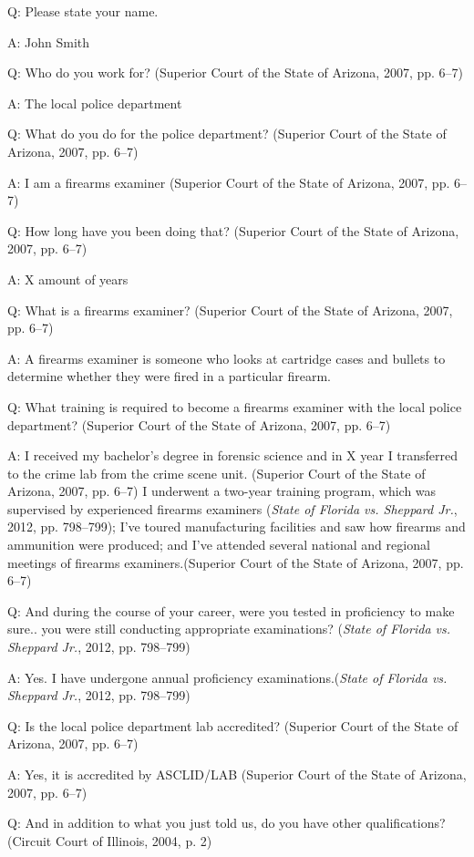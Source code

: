\documentclass[print]{nuthesis}
\begin{document}
Q: Please state your name.

A: John Smith

Q: Who do you work for? (Superior Court of the State of Arizona, 2007, pp. 6--7)

A: The local police department

Q: What do you do for the police department? (Superior Court of the State of Arizona, 2007, pp. 6--7)

A: I am a firearms examiner (Superior Court of the State of Arizona, 2007, pp. 6--7)

Q: How long have you been doing that? (Superior Court of the State of Arizona, 2007, pp. 6--7)

A: X amount of years

Q: What is a firearms examiner? (Superior Court of the State of Arizona, 2007, pp. 6--7)

A: A firearms examiner is someone who looks at cartridge cases and bullets to determine whether they were fired in a particular firearm.

Q: What training is required to become a firearms examiner with the local police department? (Superior Court of the State of Arizona, 2007, pp. 6--7)

A: I received my bachelor's degree in forensic science and in X year I transferred to the crime lab from the crime scene unit. (Superior Court of the State of Arizona, 2007, pp. 6--7)
I underwent a two-year training program, which was supervised by experienced firearms examiners (\emph{State of {Florida} vs. Sheppard {Jr.}}, 2012, pp. 798--799);
I've toured manufacturing facilities and saw how firearms and ammunition were produced; and I've attended several national and regional meetings of firearms examiners.(Superior Court of the State of Arizona, 2007, pp. 6--7)

Q: And during the course of your career, were you tested in proficiency to make sure.. you were still conducting appropriate examinations? (\emph{State of {Florida} vs. Sheppard {Jr.}}, 2012, pp. 798--799)

A: Yes. I have undergone annual proficiency examinations.(\emph{State of {Florida} vs. Sheppard {Jr.}}, 2012, pp. 798--799)

Q: Is the local police department lab accredited? (Superior Court of the State of Arizona, 2007, pp. 6--7)

A: Yes, it is accredited by ASCLID/LAB (Superior Court of the State of Arizona, 2007, pp. 6--7)

Q: And in addition to what you just told us, do you have other qualifications? (Circuit Court of Illinois, 2004, p. 2)
\end{document}

